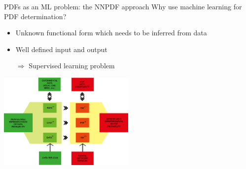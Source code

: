 \documentclass[aspectratio=169,10pt]{beamer}
\begin{document}
\begin{frame}{PDFs as an ML problem: the NNPDF approach}
   	Why use machine learning for PDF determination?
    \begin{itemize}
        \item Unknown functional form which needs to be inferred from data
        \item Well defined input and output
        \item[$\Rightarrow$] Supervised learning problem
    \end{itemize}
    \vspace*{1em}
\begin{center}
\vspace*{-1cm}
\includegraphics[width=0.5\textwidth]{intro/NNPDF_MC_strategy}
\end{center}
\end{frame}


%
%
\end{document}

